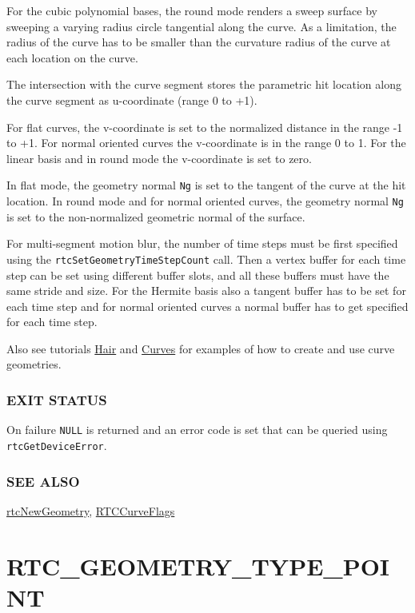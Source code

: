 For the cubic polynomial bases, the round mode renders a sweep surface
by sweeping a varying radius circle tangential along the curve. As a
limitation, the radius of the curve has to be smaller than the curvature
radius of the curve at each location on the curve.

The intersection with the curve segment stores the parametric hit
location along the curve segment as u-coordinate (range 0 to +1).

For flat curves, the v-coordinate is set to the normalized distance in
the range -1 to +1. For normal oriented curves the v-coordinate is in
the range 0 to 1. For the linear basis and in round mode the
v-coordinate is set to zero.

In flat mode, the geometry normal \texttt{Ng} is set to the tangent of
the curve at the hit location. In round mode and for normal oriented
curves, the geometry normal \texttt{Ng} is set to the non-normalized
geometric normal of the surface.

For multi-segment motion blur, the number of time steps must be first
specified using the \texttt{rtcSetGeometryTimeStepCount} call. Then a
vertex buffer for each time step can be set using different buffer
slots, and all these buffers must have the same stride and size. For the
Hermite basis also a tangent buffer has to be set for each time step and
for normal oriented curves a normal buffer has to get specified for each
time step.

Also see tutorials \hyperref[hair]{Hair} and
\hyperref[buxe9zier-curves]{Curves} for examples of how to create and
use curve geometries.

\subsubsection{EXIT STATUS}\label{exit-status}

On failure \texttt{NULL} is returned and an error code is set that can
be queried using \texttt{rtcGetDeviceError}.

\subsubsection{SEE ALSO}\label{see-also}

\hyperref[rtcnewgeometry]{rtcNewGeometry},
\hyperref[rtccurveflags]{RTCCurveFlags}

\pagebreak

\section{RTC\_GEOMETRY\_TYPE\_POINT}\label{rtc_geometry_type_point}

